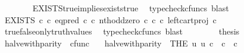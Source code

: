 \begin{isabellebody}
\ \ \ \ \ \ \isamarkupfalse%
\ EXISTS{\isacharunderscore}{\kern0pt}true{\isacharunderscore}{\kern0pt}implies{\isacharunderscore}{\kern0pt}exists{\isacharunderscore}{\kern0pt}true\ \isamarkupfalse%
\ {\isacharparenleft}{\kern0pt}typecheck{\isacharunderscore}{\kern0pt}cfuncs{\isacharcomma}{\kern0pt}\ blast{\isacharparenright}{\kern0pt}\isanewline
\ \ \ \ \isamarkupfalse%
\ \isamarkupfalse%
\ {\isachardoublequoteopen}EXISTS\ {\isasymnat}\isactrlsub c\ {\isasymcirc}\isactrlsub c\ {\isacharparenleft}{\kern0pt}{\isacharparenleft}{\kern0pt}eq{\isacharunderscore}{\kern0pt}pred\ {\isasymnat}\isactrlsub c\ {\isasymcirc}\isactrlsub c\ {\isasymlangle}nth{\isacharunderscore}{\kern0pt}odd{\isacharcomma}{\kern0pt}zero\ {\isasymcirc}\isactrlsub c\ {\isasymbeta}\isactrlbsub {\isasymnat}\isactrlsub c\isactrlesub {\isasymrangle}{\isacharparenright}{\kern0pt}\ {\isasymcirc}\isactrlsub c\ left{\isacharunderscore}{\kern0pt}cart{\isacharunderscore}{\kern0pt}proj\ {\isasymnat}\isactrlsub c\ {\isasymone}{\isacharparenright}{\kern0pt}\isactrlsup {\isasymsharp}\ {\isacharequal}{\kern0pt}\ {\isasymf}{\isachardoublequoteclose}\isanewline
\ \ \ \ \ \ \isamarkupfalse%
\ true{\isacharunderscore}{\kern0pt}false{\isacharunderscore}{\kern0pt}only{\isacharunderscore}{\kern0pt}truth{\isacharunderscore}{\kern0pt}values\ \isamarkupfalse%
\ {\isacharparenleft}{\kern0pt}typecheck{\isacharunderscore}{\kern0pt}cfuncs{\isacharcomma}{\kern0pt}\ blast{\isacharparenright}{\kern0pt}\isanewline
\ \ \isamarkupfalse%
\isanewline
\ \ \isamarkupfalse%
\ \isamarkupfalse%
\ {\isacharquery}{\kern0pt}thesis\isacommand{{\isachardot}{\kern0pt}}\isamarkupfalse%
\isanewline
{}\isamarkupfalse%
%
\endisatagproof
{\isafoldproof}%
%
\isadelimproof
%
\endisadelimproof
%
\isadelimdocument
%
\endisadelimdocument
%
\isatagdocument
%
\isamarkuptrue%
%
\endisatagdocument
{\isafolddocument}%
%
\isadelimdocument
%
\endisadelimdocument
{}\isamarkupfalse%
\ halve{\isacharunderscore}{\kern0pt}with{\isacharunderscore}{\kern0pt}parity\ {\isacharcolon}{\kern0pt}{\isacharcolon}{\kern0pt}\ {\isachardoublequoteopen}cfunc{\isachardoublequoteclose}\ \isanewline
\ \ {\isachardoublequoteopen}halve{\isacharunderscore}{\kern0pt}with{\isacharunderscore}{\kern0pt}parity\ {\isacharequal}{\kern0pt}\ {\isacharparenleft}{\kern0pt}THE\ u{\isachardot}{\kern0pt}\ u{\isacharcolon}{\kern0pt}\ {\isasymnat}\isactrlsub c\ {\isasymrightarrow}\ {\isasymnat}\isactrlsub c\ {\isasymCoprod}\ {\isasymnat}\isactrlsub c\ {\isasymand}\ \isanewline

\end{isabellebody}
